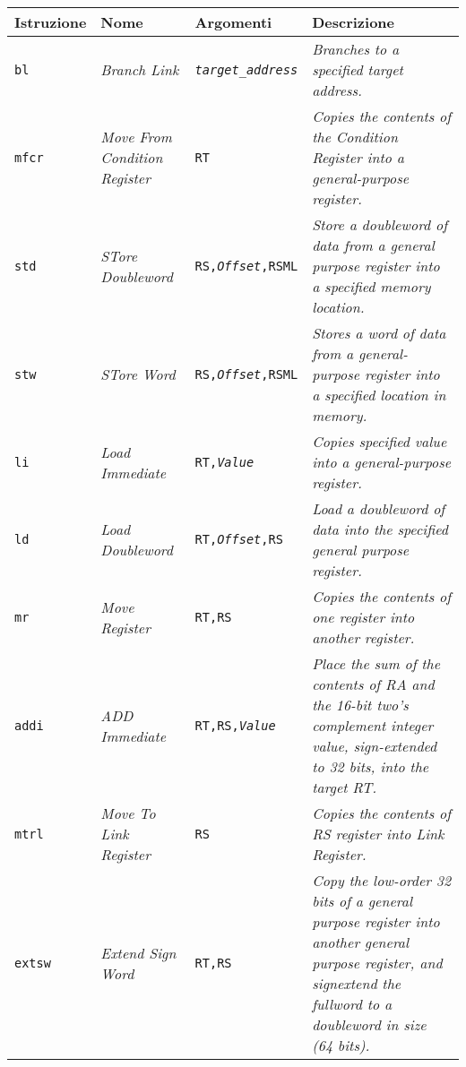 \documentclass[10pt,a4paper, titlepage]{report}
\begin{document}
\begin{table}[h!]
	    \label{tab:AssemblyIstrucions}
	    \begin{adjustbox}{center=\textwidth}
	    \begin{tabular}{l|l|l|p{6cm}}
	      \toprule
	      Istruzione & Nome & Argomenti & Descrizione \\
	   		\midrule
	   		\texttt{bl} & \textit{Branch Link} & \texttt{\textit{target\_address}} & \textit{Branches to a specified target address.} \\
	   	\hline
   	       \texttt{mfcr} & \textit{Move From Condition Register} & \texttt{RT} & \textit{Copies the contents of the Condition Register into a general-purpose register.} \\
 \hline
	       \texttt{std} & \textit{STore Doubleword} & \texttt{RS,\textit{Offset},RSML} & \textit{Store a doubleword of data from a general purpose register into a specified memory location.}\\
	      \hline 
	       \texttt{stw} & \textit{STore Word} & \texttt{RS,\textit{Offset},RSML} & \textit{Stores a word of data from a general-purpose register into a specified location in memory.} \\
	       \hline
	       \texttt{li} & \textit{Load Immediate} & \texttt{RT,\textit{Value}} & \textit{Copies specified value into a general-purpose register.} \\
	       \hline
	       \texttt{ld} & \textit{Load Doubleword} & \texttt{RT,\textit{Offset},RS} & \textit{Load a doubleword of data into the specified general purpose register.} \\
	       \hline
	       \texttt{mr} & \textit{Move Register} & \texttt{RT,RS} & \textit{Copies the contents of one register into another register.} \\
	       \hline
	       \texttt{addi} & \textit{ADD Immediate} & \texttt{RT,RS,\textit{Value}} & \textit{Place the sum of the contents of RA and the 16-bit two's complement integer value, sign-extended to 32 bits, into the target RT.} \\
	       	\hline
	       	\texttt{mtrl} & \textit{Move To Link Register} & \texttt{RS} & \textit{Copies the contents of RS register into Link Register.} \\
\hline
\texttt{extsw} & \textit{Extend Sign Word} & \texttt{RT,RS} & \textit{Copy the low-order 32 bits of a general purpose register into another general purpose register, and signextend the fullword to a doubleword in size (64 bits).} \\
	       	
	     
	      \bottomrule
	    \end{tabular}
	       \end{adjustbox}
	\end{table}
\end{document}
